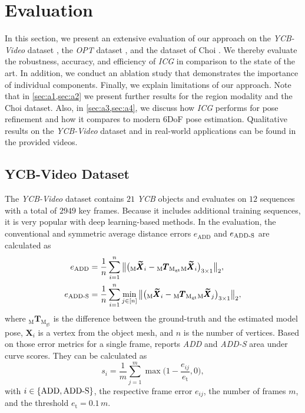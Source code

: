 \documentclass[10pt,twocolumn,letterpaper]{article}
\begin{document}
 

\section{Evaluation}\label{sec:e}
In this section, we present an extensive evaluation of our approach on the \textit{YCB-Video} dataset \cite{Xiang2018}, the \textit{OPT} dataset \cite{Wu2017}, and the dataset of Choi \cite{Choi2013}.
We thereby evaluate the robustness, accuracy, and efficiency of \textit{ICG} in comparison to the state of the art.
In addition, we conduct an ablation study that demonstrates the importance of individual components.
Finally, we explain limitations of our approach.
Note that in \cref{sec:a1,sec:a2} we present further results for the region modality and the Choi dataset.
Also, in \cref{sec:a3,sec:a4}, we discuss how \textit{ICG} performs for pose refinement and how it compares to modern \ac{6DoF} pose estimation.
Qualitative results on the \textit{YCB-Video} dataset and in real-world applications can be found in the provided videos.



\subsection{YCB-Video Dataset}\label{ssec:e0}
The \textit{YCB-Video} dataset \cite{Xiang2018} contains $21$ \textit{YCB} objects \cite{Calli2015} and evaluates on $12$ sequences with a total of $2949$ key frames.
Because it includes additional training sequences, it is very popular with deep learning-based methods.
In the evaluation, the conventional and symmetric average distance errors $e_\textrm{ADD}$ and $e_\textrm{ADD\textnormal{-}S}$ \cite{Hinterstoisser2013} are calculated as
\begin{align}\label{eq:e00}
	e_\textrm{ADD} &= \frac{1}{n}\sum_{i=1}^n\big\lVert \big({}_\textrm{M}\pmb{\widetilde{X}}_i -  {}_\textrm{M}\pmb{T}_{\textrm{M}_\textrm{gt}}{}_\textrm{M}\pmb{\widetilde{X}}_i\big)_{3\times 1}\big\rVert_2,\\\label{eq:e01}
	e_\textrm{ADD\textnormal{-}S} &= \frac{1}{n}\sum_{i=1}^n \min_{j\in[n]} \big\lVert \big({}_\textrm{M}\pmb{\widetilde{X}}_i -  {}_\textrm{M}\pmb{T}_{\textrm{M}_\textrm{gt}}{}_\textrm{M}\pmb{\widetilde{X}}_j\big)_{3\times 1}\big\rVert_2,
\end{align}
where ${}_\textrm{M}\pmb{T}_{\textrm{M}_\textrm{gt}}$ is the difference between the ground-truth and the estimated model pose, $\pmb{X}_i$ is a vertex from the object mesh, and $n$ is the number of vertices.
Based on those error metrics for a single frame, \cite{Xiang2018} reports \textit{ADD} and \textit{ADD-S} area under curve scores.
They can be calculated as
\begin{equation}
	s_i = \frac{1}{m}\sum_{j=1}^m \max\Big(1 - \frac{e_{ij}}{e_\textrm{t}}, 0\Big),
\end{equation}
with $i \in \{\textrm{ADD}, \textrm{ADD\textnormal{-}S}\}$, the respective frame error $e_{ij}$, the number of frames $m$, and the threshold $e_\textrm{t} = 0.1\,\unit{m}$.
\end{document}
